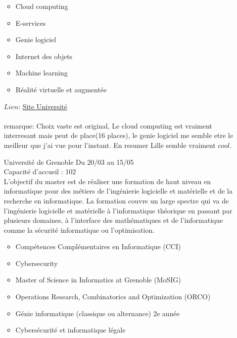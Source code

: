 \documentclass[a4paper,11pt]{article}
\begin{document}
\begin{enumerate}
                \begin{itemize}
                    \item Cloud computing
                    \item E-services
                    \item Genie logiciel
                    \item Internet des objets
                    \item Machine learning
                    \item Réalité virtuelle et augmentée
                \end{itemize}
                $Lien$: \href{https://sciences-technologies.univ-lille.fr/informatique/formation/master-informatique}{Site Université}\\
                \\remarque: Choix vaste est original, Le cloud computing est vraiment interresant mais peut de place(16 places), le genie logiciel me semble etre le meilleur que j'ai vue pour l'instant. En resumer Lille semble vraiment $cool$.
\\
        \item [\color{LightOrangeHaf}Université de Grenoble] Du 20/03 au 15/05
                \\Capacité d'accueil : 102
                \\L’objectif du master est de réaliser une formation de haut niveau en informatique pour des métiers de l’ingénierie logicielle et matérielle et de la recherche en informatique. La formation couvre un large spectre qui va de l’ingénierie logicielle et matérielle à l’informatique théorique en passant par plusieurs domaines, à l’interface des mathématiques et de l’informatique comme la sécurité informatique ou l’optimisation.
                \begin{itemize}
                    \item Compétences Complémentaires en Informatique (CCI) 
                    \item Cybersecurity
                    \item Master of Science in Informatics at Grenoble (MoSIG)
                    \item Operations Research, Combinatorics and Optimization (ORCO) 
                    \item Génie informatique (classique ou alternance) 2e année
                    \item Cybersécurité et informatique légale
                \end{itemize}

\end{enumerate}
\end{document}
